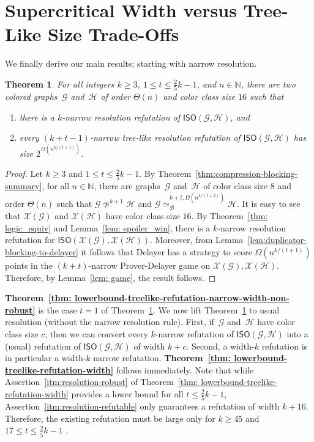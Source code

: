 \documentclass[10pt,a4paper]{article}
\newcommand{\nat}{\mathbb{N}}
\newcommand{\graphG}{\mathcal{G}}
\newcommand{\graphH}{\mathcal{H}}
\newcommand{\graphXG}{\mathcal{X}(\mathcal{G})}
\newcommand{\graphXH}{\mathcal{X}(\mathcal{H})}
\newcommand{\ISO}{\mathsf{ISO}(\graphG, \graphH)}
\newcommand{\XISO}{\mathsf{ISO}(\graphXG, \graphXH)}
\newcommand{\kbequivr}[2]{\simeq_{\mathcal{B}}^{#1,#2}}
\newcommand{\notkequiv}[1]{\not\simeq^{#1}}
\newtheorem{theorem}{Theorem}
\begin{document}
         
        \section{Supercritical Width versus Tree-Like Size Trade-Offs}

	
We finally derive our main results; starting with narrow resolution.

\begin{theorem}\label{thm: lowerbound-treelike-refutation-narrow-width}
	For all integers $k \geq 3$,  $1\leq t \leq \frac{2}{5}k-1$, and $n\in \nat$, there are two colored graphs~$\graphG$ and~$\graphH$
	of order $\Theta(n)$ and color class size $16$
	such that 
	\begin{enumerate}
		\item there is a $k$-narrow resolution refutation of $\ISO$, and
		\item every $(k+t-1)$-narrow tree-like resolution refutation of $\ISO$ has size $2^{\Omega(n^{k/{(t+1)}})}$.
	\end{enumerate}
\end{theorem}	
\begin{proof}
	Let $k \geq 3$ and $1 \leq t \leq  \frac{2}{5}k-1$.
	By Theorem~\ref{thm:compression-blocking-summary}, for all $n \in \nat$, there are graphs~$\graphG$ and~$\graphH$ of color class size $8$ and order $\Theta(n)$
	such that $\graphG \notkequiv{k+1} \graphH$ 
	and $\graphG \kbequivr{k+t}{\Omega(n^{k/(t+2)})} \graphH$.
	It is easy to see that $\graphXG$ and $\graphXH$ have color class size $16$.
	By Theorem~\ref{thm: logic_equiv} and Lemma~\ref{lem: spoiler_win},
	there is a $k$-narrow resolution refutation for $\XISO$.
	Moreover, from Lemma~\ref{lem:duplicator-blocking-to-delayer} it follows that Delayer has a strategy to score $\Omega(n^{k/(t+1)})$ points in the $(k+t)$\nobreakdash-narrow Prover-Delayer game on $\graphXG, \graphXH$. Therefore, by Lemma~\ref{lem: game}, the result follows.
%
\end{proof}

\noindent \textbf{Theorem~\ref{thm: lowerbound-treelike-refutation-narrow-width-non-robust}}
is the case $t=1$ of Theorem~\ref{thm: lowerbound-treelike-refutation-narrow-width}. We now lift Theorem~\ref{thm: lowerbound-treelike-refutation-narrow-width} to usual resolution (without the narrow resolution rule).
First, if~$\graphG$ and~$\graphH$ have color class size $c$, then we can convert every $k$-narrow refutation of $\ISO$ into a (usual) refutation of $\ISO$ of width $k+c$.
Second, a width-$k$ refutation is in particular a width-$k$ narrow refutation.
\textbf{Theorem~\ref{thm: lowerbound-treelike-refutation-width}} follows immediately.
Note that while Assertion~\ref{itm:resolution-robust} of Theorem~\ref{thm: lowerbound-treelike-refutation-width} provides a lower bound for all $t \leq \frac{2}{5}k -1 $, Assertion~\ref{itm:resolution-refutable} only guarantees a refutation of width $k + 16$.
Therefore, the existing refutation must be large only for $k\geq 45$ and $17 \le t \leq \frac{2}{5}k -1$ .
\end{document}
